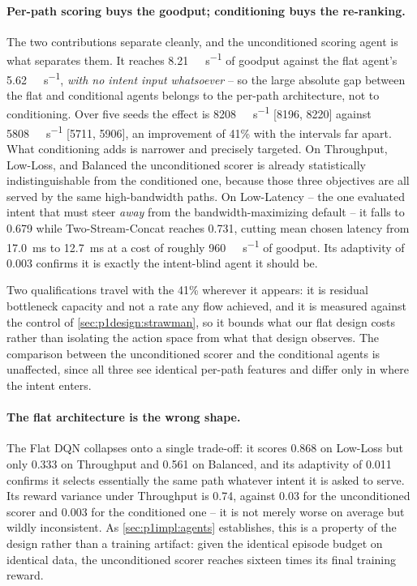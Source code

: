 \paragraph{Per-path scoring buys the goodput; conditioning buys the re-ranking.} The two contributions
separate cleanly, and the unconditioned scoring agent is what separates them. It reaches
\SI{8.21}{\giga\bit\per\second} of goodput against the flat agent's \SI{5.62}{\giga\bit\per\second},
\emph{with no intent input whatsoever} -- so the large absolute gap between the flat and conditional
agents belongs to the per-path architecture, not to conditioning. Over five seeds the effect is
\SI{8208}{\mega\bit\per\second} [8196, 8220] against \SI{5808}{\mega\bit\per\second} [5711, 5906], an
improvement of 41\% with the intervals far apart. What conditioning adds
is narrower and precisely targeted. On Throughput, Low-Loss, and Balanced the unconditioned scorer is
already statistically indistinguishable from the conditioned one, because those three objectives are all
served by the same high-bandwidth paths. On Low-Latency -- the one evaluated intent that must steer
\emph{away} from the bandwidth-maximizing default -- it falls to 0.679 while Two-Stream-Concat reaches
0.731, cutting mean chosen latency from \SI{17.0}{\milli\second} to \SI{12.7}{\milli\second} at a cost of
roughly \SI{960}{\mega\bit\per\second} of goodput. Its adaptivity of 0.003 confirms it is exactly the
intent-blind agent it should be.

Two qualifications travel with the 41\% wherever it appears: it is residual bottleneck capacity and not
a rate any flow achieved, and it is measured against the control of \cref{sec:p1design:strawman}, so it
bounds what our flat design costs rather than isolating the action space from what that design observes.
The comparison between the unconditioned scorer and the conditional agents is unaffected, since all
three see identical per-path features and differ only in where the intent enters.

\paragraph{The flat architecture is the wrong shape.} The Flat DQN collapses onto a single trade-off: it
scores 0.868 on Low-Loss but only 0.333 on Throughput and 0.561 on Balanced, and its adaptivity of 0.011
confirms it selects essentially the same path whatever intent it is asked to serve. Its reward variance
under Throughput is 0.74, against 0.03 for the unconditioned scorer and 0.003 for the conditioned one --
it is not merely worse on average but wildly inconsistent. As \cref{sec:p1impl:agents} establishes,
this is a property of the design rather than a training artifact: given the identical episode budget on
identical data, the unconditioned scorer reaches sixteen times its final training reward.

